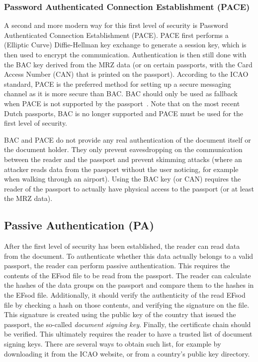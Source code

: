 \subsubsection{Password Authenticated Connection Establishment (PACE)}\label{subsubsec:password-authenticated-connection-establishment}
A second and more modern way for this first level of security is Password Authenticated Connection Establishment (PACE).
PACE first performs a (Elliptic Curve) Diffie-Hellman key exchange to generate a session key, which is then used to encrypt the communication.
Authentication is then still done with the BAC key derived from the MRZ data (or on certain passports, with the Card Access Number (CAN) that is printed on the passport).
According to the ICAO standard, PACE is the preferred method for setting up a secure messaging channel as it is more secure than BAC.
BAC should only be used as fallback when PACE is not supported by the passport~\cite{icao9303securitymechanisms}.
Note that on the most recent Dutch passports, BAC is no longer supported and PACE must be used for the first level of security.


BAC and PACE do not provide any real authentication of the document itself or the document holder.
They only prevent eavesdropping on the communication between the reader and the passport and prevent skimming attacks (where an attacker reads data from the passport without the user noticing, for example when walking through an airport).
Using the BAC key (or CAN) requires the reader of the passport to actually have physical access to the passport (or at least the MRZ data).

\subsection{Passive Authentication (PA)}\label{subsec:passive-authentication}
After the first level of security has been established, the reader can read data from the document.
To authenticate whether this data actually belongs to a valid passport, the reader can perform passive authentication.
This requires the contents of the EFsod file to be read from the passport.
The reader can calculate the hashes of the data groups on the passport and compare them to the hashes in the EFsod file.
Additionally, it should verify the authenticity of the read EFsod file by checking a hash on those contents, and verifying the signature on the file.
This signature is created using the public key of the country that issued the passport, the so-called \textit{document signing key}.
Finally, the certificate chain should be verified.
This ultimately requires the reader to have a trusted list of document signing keys.
There are several ways to obtain such list, for example by downloading it from the ICAO website, or from a country's public key directory.


